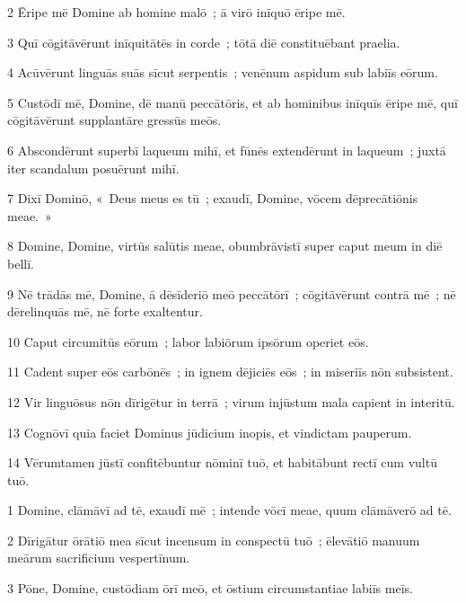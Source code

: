 \psalmVerse
  {\phantom{00}2}
  {Ēripe mē Domine ab homine malō~; ā virō inīquō ēripe mē.}


\psalmVerse
  {\phantom{00}3}
  {Quī cōgitāvērunt inīquitātēs in corde~; tōtā diē constituēbant praelia.}


\psalmVerse
  {\phantom{00}4}
  {Acūvērunt linguās suās sīcut serpentis~; venēnum aspidum sub labiīs eōrum.}


\psalmVerse
  {\phantom{00}5}
  {Custōdī mē, Domine, dē manū peccātōris, et ab hominibus inīquīs ēripe mē, quī cōgitāvērunt supplantāre gressūs meōs.}


\psalmVerse
  {\phantom{00}6}
  {Abscondērunt superbī laqueum mihī, et fūnēs extendērunt in laqueum~; juxtā iter scandalum posuērunt mihī.}


\psalmVerse
  {\phantom{00}7}
  {Dixī Dominō, «~Deus meus es tū~; exaudī, Domine, vōcem dēprecātiōnis meae.~»}


\psalmVerse
  {\phantom{00}8}
  {Domine, Domine, virtūs salūtis meae, obumbrāvistī super caput meum in diē bellī.}


\psalmVerse
  {\phantom{00}9}
  {Nē trādās mē, Domine, ā dēsīderiō meō peccātōrī~; cōgitāvērunt contrā mē~; nē dērelinquās mē, nē forte exaltentur.}


\psalmVerse
  {\phantom{0}10}
  {Caput circumitūs eōrum~; labor labiōrum ipsōrum operiet eōs.}


\psalmVerse
  {\phantom{0}11}
  {Cadent super eōs carbōnēs~; in ignem dējiciēs eōs~; in miseriīs nōn subsistent.}


\psalmVerse
  {\phantom{0}12}
  {Vir linguōsus nōn dīrigētur in terrā~; virum injūstum mala capient in interitū.}


\psalmVerse
  {\phantom{0}13}
  {Cognōvī quia faciet Dominus jūdicium inopis, et vindictam pauperum.}


\psalmVerse
  {\phantom{0}14}
  {Vērumtamen jūstī confitēbuntur nōminī tuō, et habitābunt rectī cum vultū tuō.}




\psalmVerse
  {\phantom{00}1}
  {Domine, clāmāvī ad tē, exaudī mē~; intende vōcī meae, quum clāmāverō ad tē.}


\psalmVerse
  {\phantom{00}2}
  {Dīrigātur ōrātiō mea sīcut incensum in conspectū tuō~; ēlevātiō manuum meārum sacrificium vespertīnum.}


\psalmVerse
  {\phantom{00}3}
  {Pōne, Domine, custōdiam ōrī meō, et ōstium circumstantiae labiīs meīs.}


